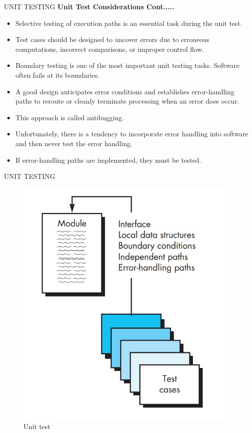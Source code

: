 \documentclass{beamer}
\begin{document}
\begin{frame}{UNIT TESTING}
	\textbf{Unit Test Considerations Cont.....}
	\begin{itemize}
		\item Selective testing of execution paths is an essential task during the unit test.
		\item Test cases should be designed to uncover errors due to erroneous computations, incorrect comparisons, or improper control flow.
		\item Boundary testing is one of the most important unit testing tasks. Software often fails at its boundaries.
		\item A good design anticipates error conditions and establishes error-handling paths to reroute or cleanly terminate processing when an error does occur. 
		\item This approach is called antibugging. 
		\item Unfortunately, there is a tendency to incorporate error handling into software and then never test the error handling.
		\item If error-handling paths are implemented, they must be tested.
	\end{itemize}
\end{frame}
\begin{frame}{UNIT TESTING}
		\begin{figure}
	\includegraphics[scale=.4]{img/m3_24}
	\caption{Unit test}
\end{figure}
\end{frame}
\end{document}
